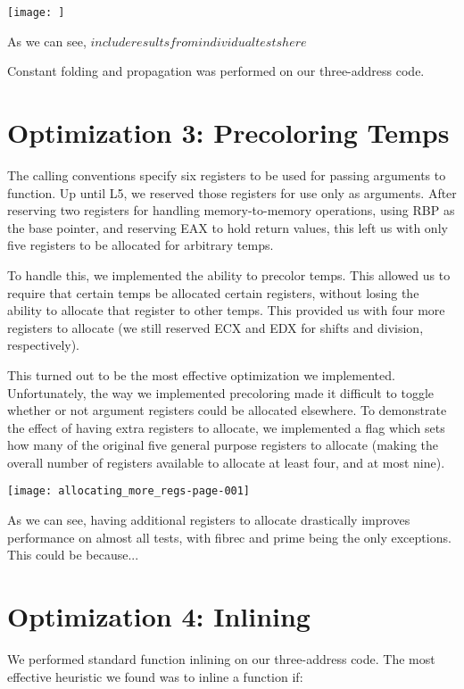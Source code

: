 \documentclass{article}
\begin{document}
\texttt{[image: ]}



As we can see, $include results from individual tests here$

Constant folding and propagation was performed on our three-address code.

\section{Optimization 3: Precoloring Temps}

The calling conventions specify six registers to be used for passing arguments to function. Up until L5, we reserved those registers for use only as arguments. After reserving two registers for handling memory-to-memory operations, using RBP as the base pointer, and reserving EAX to hold return values, this left us with only five registers to be allocated for arbitrary temps.

To handle this, we implemented the ability to precolor temps. This allowed us to require that certain temps be allocated certain registers, without losing the ability to allocate that register to other temps. This provided us with four more registers to allocate (we still reserved ECX and EDX for shifts and division, respectively). 

This turned out to be the most effective optimization we implemented. Unfortunately, the way we implemented precoloring made it difficult to toggle whether or not argument registers could be allocated elsewhere. To demonstrate the effect of having extra registers to allocate, we implemented a flag which sets how many of the original five general purpose registers to allocate (making the overall number of registers available to allocate at least four, and at most nine).

\texttt{[image: allocating\_more\_regs-page-001]}

As we can see, having additional registers to allocate drastically improves performance on almost all tests, with fibrec and prime being the only exceptions. This could be because...


\section{Optimization 4: Inlining}

We performed standard function inlining on our three-address code. The most effective heuristic we found was to inline a function if:
\end{document}
